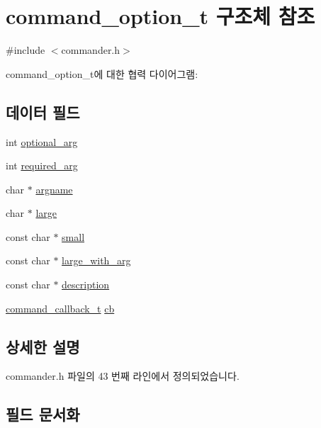 \hypertarget{structcommand__option__t}{}\section{command\+\_\+option\+\_\+t 구조체 참조}
\label{structcommand__option__t}


{\ttfamily \#include $<$commander.\+h$>$}



command\+\_\+option\+\_\+t에 대한 협력 다이어그램\+:
\subsection*{데이터 필드}
\begin{DoxyCompactItemize}
\item 
int \mbox{\hyperlink{structcommand__option__t_ac61844c0b6ee59a91d96d87c76fa5496}{optional\+\_\+arg}}
\item 
int \mbox{\hyperlink{structcommand__option__t_ac6663933e6c1de1f976cb0b8121826d2}{required\+\_\+arg}}
\item 
char $\ast$ \mbox{\hyperlink{structcommand__option__t_a962021ca6b3839f79990c877809f2941}{argname}}
\item 
char $\ast$ \mbox{\hyperlink{structcommand__option__t_a43b3769913dedef81b056f70e964f99d}{large}}
\item 
const char $\ast$ \mbox{\hyperlink{structcommand__option__t_affc6f941b2cbe7ba0b9b800b036d28ab}{small}}
\item 
const char $\ast$ \mbox{\hyperlink{structcommand__option__t_af7aaa26ba49fe7d62e471ec519583b84}{large\+\_\+with\+\_\+arg}}
\item 
const char $\ast$ \mbox{\hyperlink{structcommand__option__t_a68344fa88cf4e86b5079fd69a5c22d57}{description}}
\item 
\mbox{\hyperlink{commander_8h_a110927182d6dc22f3cf1ed2382cfed0e}{command\+\_\+callback\+\_\+t}} \mbox{\hyperlink{structcommand__option__t_a6cb49132b9956186ad247c8f2c823a03}{cb}}
\end{DoxyCompactItemize}


\subsection{상세한 설명}


commander.\+h 파일의 43 번째 라인에서 정의되었습니다.



\subsection{필드 문서화}
\mbox{\label{structcommand__option__t_a962021ca6b3839f79990c877809f2941}} 
